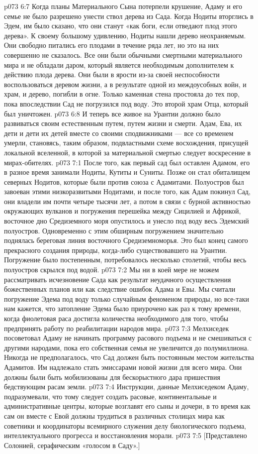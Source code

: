 \vs p073 6:7 \pc Когда планы Материального Сына потерпели крушение, Адаму и его семье не было разрешено унести ствол дерева из Сада. Когда Нодиты вторглись в Эдем, им было сказано, что они станут «как боги, если отведают плод этого дерева». К своему большому удивлению, Нодиты нашли дерево неохраняемым. Они свободно питались его плодами в течение ряда лет, но это на них совершенно не сказалось. Все они были обычными смертными материального мира и не обладали даром, который является необходимым дополнителем к действию плода дерева. Они были в ярости из\hyp{}за своей неспособности воспользоваться деревом жизни, а в результате одной из междоусобных войн, и храм, и дерево, погибли в огне. Только каменная стена простояла до тех пор, пока впоследствии Сад не погрузился под воду. Это второй храм Отца, который был уничтожен.
\vs p073 6:8 И теперь все живое на Урантии должно было развиваться своим естественным путем, путем жизни и смерти. Адам, Ева, их дети и дети их детей вместе со своими сподвижниками --- все со временем умерли, становясь, таким образом, подвластными схеме восхождения, присущей локальной вселенной, в которой за материальной смертью следует воскресение в мирах\hyp{}обителях.
\vs p073 7:1 После того, как первый сад был оставлен Адамом, его в разное время занимали Нодиты, Кутиты и Суниты. Позже он стал обиталищем северных Нодитов, которые были против союза с Адамитами. Полуостров был завоеван этими низкоразвитыми Нодитами, и после того, как Адам покинул Сад, они владели им почти четыре тысячи лет, а потом в связи с бурной активностью окружающих вулканов и погружения перешейка между Сицилией и Африкой, восточное дно Средиземного моря опустилось и унесло под воду весь Эдемский полуостров. Одновременно с этим обширным погружением значительно поднялась береговая линия восточного Средиземноморья. Это был конец самого прекрасного создания природы, когда\hyp{}либо существовавшего на Урантии. Погружение было постепенным, потребовалось несколько столетий, чтобы весь полуостров скрылся под водой.
\vs p073 7:2 Мы ни в коей мере не можем рассматривать исчезновение Сада как результат неудачного осуществления божественных планов или как следствие ошибок Адама и Евы. Мы считали погружение Эдема под воду только случайным феноменом природы, но все\hyp{}таки нам кажется, что затопление Эдема было приурочено как раз к тому времени, когда фиолетовая раса достигла количества необходимого для того, чтобы предпринять работу по реабилитации народов мира.
\vs p073 7:3 \pc Мелхиседек посоветовал Адаму не начинать программу расового подъема и не смешиваться с другими народами, пока его собственная семья не увеличится до полумиллиона. Никогда не предполагалось, что Сад должен быть постоянным местом жительства Адамитов. Им надлежало стать эмиссарами новой жизни для всего мира. Они должны были быть мобилизованы для бескорыстного дара пришествия бедствующим расам земли.
\vs p073 7:4 Инструкции, данные Мелхиседеком Адаму, подразумевали, что тому следует создать расовые, континентальные и административные центры, которые возглавят его сыны и дочери, в то время как сам он вместе с Евой должны трудиться в различных столицах мира как советники и координаторы всемирного служения делу биологического подъема, интеллектуального прогресса и восстановления морали.
\vsetoff
\vs p073 7:5 [Представлено Солонией, серафическим «голосом в Саду».]
